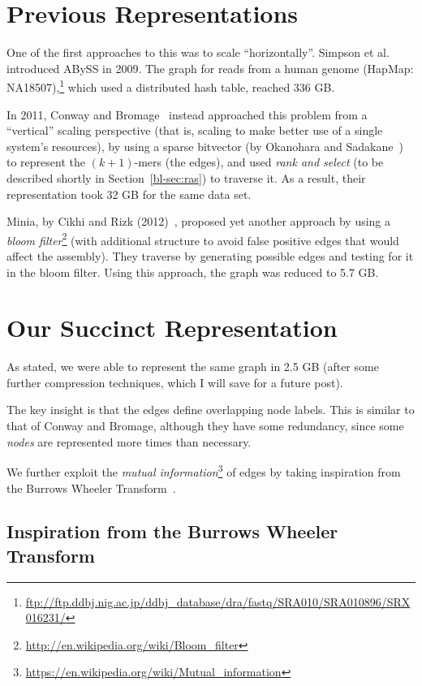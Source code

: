 \section{Previous Representations}\label{bl-sec:pre}

One of the first approaches to this was to scale ``horizontally''. Simpson et al.~\cite{Simpson:2009} introduced ABySS in 2009. The graph for reads from a human genome (HapMap: NA18507),\footnote{\url{ftp://ftp.ddbj.nig.ac.jp/ddbj_database/dra/fastq/SRA010/SRA010896/SRX016231/}} which used a distributed hash table, reached 336 GB.

In 2011, Conway and Bromage~\cite{conway} instead approached this problem from a ``vertical'' scaling perspective (that is, scaling to make better use of a single system's resources), by using a sparse bitvector (by Okanohara and Sadakane~\cite{bitvector}) to represent the $(k+1)$-mers (the edges), and used \emph{rank and select} (to be described shortly in Section~\ref{bl-sec:ras}) to traverse it. As a result, their representation took 32 GB for the same data set.

Minia, by Cikhi and Rizk (2012)~\cite{wabi}, proposed yet another approach by using a \emph{bloom filter}\footnote{\url{http://en.wikipedia.org/wiki/Bloom_filter}} (with additional structure to avoid false positive edges that would affect the assembly). They traverse by generating possible edges and testing for it in the bloom filter. Using this approach, the graph was reduced to 5.7 GB.

\section{Our Succinct Representation}\label{bl-sec:our}

As stated, we were able to represent the same graph in 2.5 GB (after some further compression techniques, which I will save for a future post).

The key insight is that the edges define overlapping node labels. This is similar to that of Conway and Bromage, although they have some redundancy, since some \emph{nodes} are represented more times than necessary.

We further exploit the \emph{mutual information}\footnote{\url{https://en.wikipedia.org/wiki/Mutual_information}} of edges by taking inspiration from the Burrows Wheeler Transform~\cite{BW94}.

\subsection{Inspiration from the Burrows Wheeler Transform}\label{bl-sec:bur}


